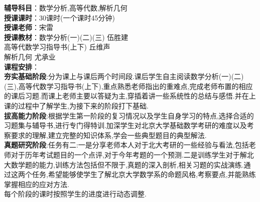 \documentclass[a4paper]{ctexart}
\begin{document}
\noindent
\textbf{辅导科目}：数学分析,高等代数,解析几何\\
\textbf{授课课时}：30课时(一个课时45分钟)\\
\textbf{授课老师}：宋雷\\
\textbf{授课教材}：数学分析(一)(二)(三) 伍胜建\\
高等代数学习指导书(上下) 丘维声\\
解析几何 尤承业\\
\textbf{课程安排}：\\
\textbf{夯实基础阶段}:分为课上与课后两个时间段.课后学生自主阅读数学分析(一)(二)(三),高等代数学习指导书(上下),重点熟悉老师指出的重难点,完成老师布置的相应的课后习题.而课上老师主要以答疑为主,穿插着讲一些系统性的总结与感悟.并在上课的过程中了解学生,为接下来的阶段打下基础.\\
\textbf{拔高能力阶段}:根据学生第一阶段的复习情况以及学生自身学习的特点,选择合适的习题集与辅导书,进行专门得特训.加深学生对北京大学基础数学考研的难度以及考察要求的理解,建立完整的知识体系,学会一些典型题目的典型解法.\\
\textbf{真题研究阶段}:任务有二:一是分享老师本人对于北大考研的一些经验与看法,包括老师对于历年考试题目的一个点评,对于今年考题的一个预测.二是训练学生对于解北大数学题的能力,训练方法包括但不限于,真题的深入剖析,相关习题的实战演练.通过这两个任务,希望能够使学生了解北京大学数学系的命题风格,考察要点,并能熟练掌握相应的应对方法.\\
每个阶段的课时按照学生的进度进行动态调整.
\end{document}

